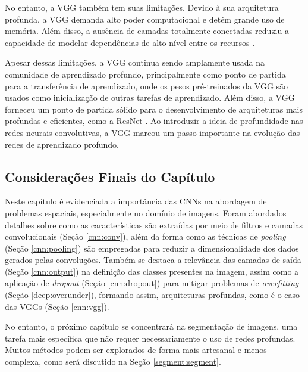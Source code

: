 No entanto, a VGG também tem suas limitações. Devido à sua arquitetura profunda, a VGG demanda alto poder computacional e detém grande uso de memória. Além disso, a ausência de camadas totalmente conectadas reduziu a capacidade de modelar dependências de alto nível entre os recursos \citep{Simonyan2015}.

Apesar dessas limitações, a VGG continua sendo amplamente usada na comunidade de aprendizado profundo, principalmente como ponto de partida para a transferência de aprendizado, onde os pesos pré-treinados da VGG são usados como inicialização de outras tarefas de aprendizado. Além disso, a VGG forneceu um ponto de partida sólido para o desenvolvimento de arquiteturas mais profundas e eficientes, como a ResNet \citep{He2016}. Ao introduzir a ideia de profundidade nas redes neurais convolutivas, a VGG marcou um passo importante na evolução das redes de aprendizado profundo.

\subsection{Considerações Finais do Capítulo}
\label{cnn:conclusion}
Neste capítulo é evidenciada a importância das CNNs na abordagem de problemas espaciais, especialmente no domínio de imagens. Foram abordados detalhes sobre como as características são extraídas por meio de filtros e camadas convolucionais (Seção \ref{cnn:conv}), além da forma como as técnicas de \textit{pooling} (Seção \ref{cnn:pooling}) são empregadas para reduzir a dimensionalidade dos dados gerados pelas convoluções. Também se destaca a relevância das camadas de saída (Seção \ref{cnn:output}) na definição das classes presentes na imagem, assim como a aplicação de \textit{dropout} (Seção \ref{cnn:dropout}) para mitigar problemas de \textit{overfitting} (Seção \ref{deep:overunder}), formando assim, arquiteturas profundas, como é o caso das VGGs (Seção \ref{cnn:vgg}).

No entanto, o próximo capítulo se concentrará na segmentação de imagens, uma tarefa mais específica que não requer necessariamente o uso de redes profundas. Muitos métodos podem ser explorados de forma mais artesanal e menos complexa, como será discutido na Seção \ref{segment:segment}.
